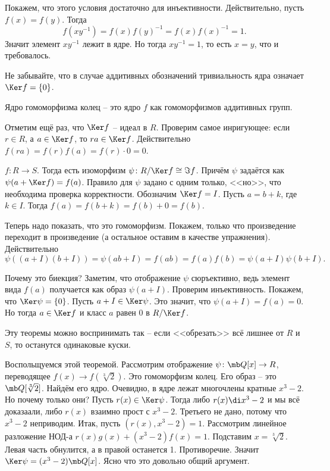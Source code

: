 Покажем, что этого условия достаточно для инъективности. Действительно, пусть $f(x)=f(y)$. Тогда $$f(xy^{-1})=f(x)f(y)^{-1}=f(x)f(x)^{-1}=1.$$
Значит элемент $xy^{-1}$ лежит в ядре. Но тогда $xy^{-1}=1$, то есть $x=y$, что и требовалось.
\endproof

\rm Не забывайте, что в случае аддитивных обозначений тривиальность ядра означает $\Ker f=\{0\}$.
\erm

\rm Ядро гомоморфизма колец -- это ядро $f$ как гомоморфизмов аддитивных групп.
\erm

\rm Отметим ещё раз, что $\Ker f$ -- идеал в $R$. Проверим самое инригующее: если $r\in R$, а $a\in \Ker f$, то $ra \in \Ker f$. Действительно $f(ra)=f(r)f(a)=f(r)\cdot 0=0$.
\erm 



 $f\colon R \to S$. Тогда есть изоморфизм $\psi \colon R/\Ker f \cong \Im f$. Причём $\psi$ задаётся как $\psi(a+\Ker f)=f(a)$. 
\ethrm
\proof Правило для $\psi$ задано с одним только, <<но>>, что необходима проверка корректности. Обозначим $\Ker f=I$. Пусть $a=b+k$, где $k\in I$. Тогда $f(a)=f(b+k)=f(b)+0=f(b)$.

Теперь надо показать, что это гомоморфизм. Покажем, только что произведение переходит в произведение (а остальное оставим в качестве упражнения). Действительно
$$\psi((a+I)(b+I))=\psi(ab+I)= f(ab)=f(a)f(b)=\psi(a+I)\psi(b+I).$$

Почему это биекция? Заметим, что отображение $\psi$ сюръективно, ведь элемент вида $f(a)$ получается как образ $\psi(a+I)$. Проверим инъективность. Покажем, что $\Ker \psi =\{0\}$. 
Пусть $a+I\in \Ker \psi$. Это значит, что $\psi(a+I)=f(a)=0$. Но тогда $a\in \Ker f$ и класс $a$ равен $0$ в $R/\Ker f$. 
\endproof

Эту теоремы можно воспринимать так -- если <<обрезать>> всё лишнее от $R$ и $S$, то останутся одинаковые куски.  

Воспольщуемся этой теоремой. Рассмотрим отображение $\psi \colon \mb Q[x] \to R$, переводящее $f(x) \to f(\sqrt[3]{2})$. Это гомоморфизм колец. Его образ -- это $\mb Q[\sqrt[3]{2}]$. Найдём его ядро. Очевидно, в ядре лежат многочлены кратные $x^3-2$. Но почему только они? Пусть $r(x)\in \Ker \psi$. Тогда либо $r(x)\di x^3-2$ и мы всё доказаали, либо $r(x)$ взаимно прост с $x^3-2$. Третьего не дано, потому что $x^3-2$ неприводим. Итак, пусть $(r(x),x^3-2)=1$. Рассмотрим линейное разложение НОД-а $r(x)g(x)+(x^3-2)f(x)=1$. Подставим $x=\sqrt[3]{2}$. Левая часть обнулится, а в правой останется 1. Противоречие. Значит $\Ker \psi = (x^3-2)\mb Q[x]$. Ясно что это довольно общий аргумент. 

